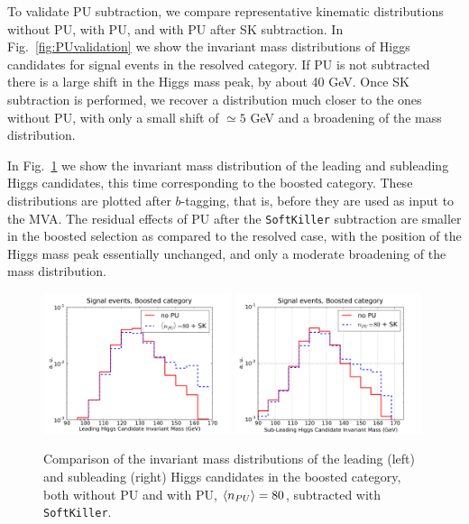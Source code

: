 To validate PU subtraction,
we compare representative kinematic distributions
without PU, with PU, and with PU after SK subtraction.
%
In Fig.~\ref{fig:PUvalidation} we show the
invariant mass distributions of Higgs candidates for signal
events in the resolved category.
%
If PU is not subtracted there is a large shift in the Higgs mass
peak, by about 40 GeV.
%
Once SK subtraction is performed, we recover a distribution much closer
to the ones without PU, with only a small shift of $\simeq 5$ GeV
and a broadening of the mass
distribution.
%

In Fig.~\ref{fig:m_H_PU} we show the invariant mass distribution
of the leading and subleading Higgs candidates,
this time corresponding
to the boosted category.
%
These distributions are plotted after
$b$-tagging, that is,
before they are used as input to the MVA.
%
The residual effects of PU
after the {\tt SoftKiller} subtraction are smaller
in the boosted selection as compared to the resolved case,
with the position of the Higgs mass peak essentially
unchanged, and only a moderate broadening of the
mass distribution.
%

\begin{figure}[t]
  \begin{center}
      \includegraphics[width=0.49\textwidth]{plots/m_H0_bst_comp.pdf}
      \includegraphics[width=0.49\textwidth]{plots/m_H1_bst_comp.pdf}
  \caption{\small
    Comparison of the invariant mass distributions of the leading (left)
    and subleading (right) Higgs candidates
    in the boosted category,
    both without PU and with
    PU, $\left\langle n_{PU}\right\rangle=80$, subtracted with {\tt SoftKiller}.
}
\label{fig:m_H_PU}
\end{center}
\end{figure}

